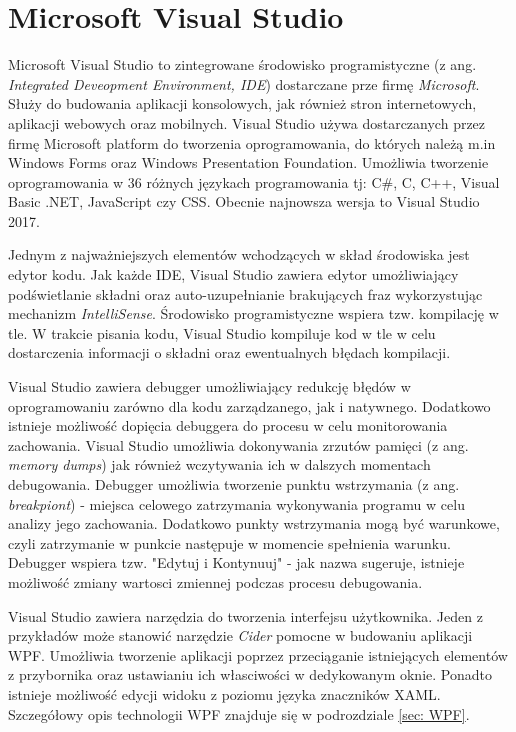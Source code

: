 \section{Microsoft Visual Studio}
Microsoft Visual Studio to zintegrowane środowisko programistyczne (z ang. \textit{Integrated Deveopment Environment, IDE}) dostarczane prze firmę \textit{Microsoft}. Służy do budowania aplikacji konsolowych, jak również stron internetowych, aplikacji webowych oraz mobilnych. Visual Studio używa dostarczanych przez firmę Microsoft platform do tworzenia oprogramowania, do których należą m.in Windows Forms oraz Windows Presentation Foundation. Umożliwia tworzenie oprogramowania w 36 różnych językach programowania tj: C\#, C, C++, Visual Basic .NET, JavaScript czy CSS. Obecnie najnowsza wersja to Visual Studio 2017. 

Jednym z najważniejszych elementów wchodzących w skład środowiska jest edytor kodu. Jak każde IDE, Visual Studio zawiera edytor umożliwiający podświetlanie składni oraz auto-uzupełnianie brakujących fraz wykorzystując mechanizm \textit{IntelliSense}. Środowisko programistyczne wspiera tzw. kompilację w tle. W trakcie pisania kodu, Visual Studio kompiluje kod w tle w celu dostarczenia informacji o składni oraz ewentualnych błędach kompilacji. 

Visual Studio zawiera debugger umożliwiający redukcję błędów w oprogramowaniu zarówno dla kodu zarządzanego, jak i natywnego. Dodatkowo istnieje możliwość dopięcia debuggera do procesu w celu monitorowania zachowania. Visual Studio umożliwia dokonywania zrzutów pamięci (z ang. \textit{memory dumps}) jak również wczytywania ich w dalszych momentach debugowania. Debugger umożliwia tworzenie punktu wstrzymania (z ang. \textit{breakpiont}) - miejsca celowego zatrzymania wykonywania programu w celu analizy jego zachowania. Dodatkowo punkty wstrzymania mogą być warunkowe, czyli zatrzymanie w punkcie następuje w momencie spełnienia warunku. Debugger wspiera tzw. "Edytuj i Kontynuuj" - jak nazwa sugeruje, istnieje możliwość zmiany wartosci zmiennej podczas procesu debugowania.

Visual Studio zawiera narzędzia do tworzenia interfejsu użytkownika. Jeden z przykładów może stanowić narzędzie \textit{Cider} pomocne w budowaniu aplikacji WPF. Umożliwia tworzenie aplikacji poprzez przeciąganie istniejących elementów z przybornika oraz ustawianiu ich własciwości w dedykowanym oknie. Ponadto istnieje możliwość edycji widoku z poziomu języka znaczników XAML. Szczegółowy opis technologii WPF znajduje się w podrozdziale \ref{sec: WPF}.

